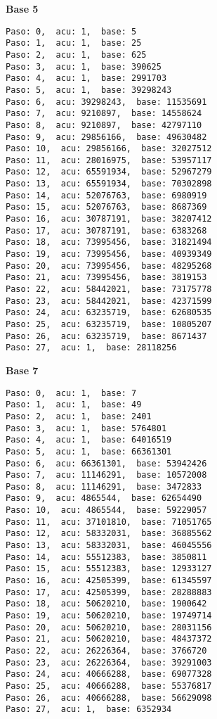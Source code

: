 \documentclass[a4paper]{article}
\begin{document}
\textbf{Base 5}
\begin{verbatim}
Paso: 0,  acu: 1,  base: 5  
Paso: 1,  acu: 1,  base: 25  
Paso: 2,  acu: 1,  base: 625  
Paso: 3,  acu: 1,  base: 390625  
Paso: 4,  acu: 1,  base: 2991703  
Paso: 5,  acu: 1,  base: 39298243  
Paso: 6,  acu: 39298243,  base: 11535691  
Paso: 7,  acu: 9210897,  base: 14558624  
Paso: 8,  acu: 9210897,  base: 42797110  
Paso: 9,  acu: 29856166,  base: 49630482  
Paso: 10,  acu: 29856166,  base: 32027512  
Paso: 11,  acu: 28016975,  base: 53957117  
Paso: 12,  acu: 65591934,  base: 52967279  
Paso: 13,  acu: 65591934,  base: 70302898  
Paso: 14,  acu: 52076763,  base: 6980919  
Paso: 15,  acu: 52076763,  base: 8687369  
Paso: 16,  acu: 30787191,  base: 38207412  
Paso: 17,  acu: 30787191,  base: 6383268  
Paso: 18,  acu: 73995456,  base: 31821494  
Paso: 19,  acu: 73995456,  base: 40939349  
Paso: 20,  acu: 73995456,  base: 48295268  
Paso: 21,  acu: 73995456,  base: 3819153  
Paso: 22,  acu: 58442021,  base: 73175778  
Paso: 23,  acu: 58442021,  base: 42371599  
Paso: 24,  acu: 63235719,  base: 62680535  
Paso: 25,  acu: 63235719,  base: 10805207  
Paso: 26,  acu: 63235719,  base: 8671437  
Paso: 27,  acu: 1,  base: 28118256
\end{verbatim}

\textbf{Base 7}
\begin{verbatim}
Paso: 0,  acu: 1,  base: 7  
Paso: 1,  acu: 1,  base: 49  
Paso: 2,  acu: 1,  base: 2401  
Paso: 3,  acu: 1,  base: 5764801  
Paso: 4,  acu: 1,  base: 64016519  
Paso: 5,  acu: 1,  base: 66361301  
Paso: 6,  acu: 66361301,  base: 53942426  
Paso: 7,  acu: 11146291,  base: 10572008  
Paso: 8,  acu: 11146291,  base: 3472833  
Paso: 9,  acu: 4865544,  base: 62654490  
Paso: 10,  acu: 4865544,  base: 59229057  
Paso: 11,  acu: 37101810,  base: 71051765  
Paso: 12,  acu: 58332031,  base: 36885562  
Paso: 13,  acu: 58332031,  base: 46045556  
Paso: 14,  acu: 55512383,  base: 3850811  
Paso: 15,  acu: 55512383,  base: 12933127  
Paso: 16,  acu: 42505399,  base: 61345597  
Paso: 17,  acu: 42505399,  base: 28288883  
Paso: 18,  acu: 50620210,  base: 1900642  
Paso: 19,  acu: 50620210,  base: 19749714  
Paso: 20,  acu: 50620210,  base: 28031156  
Paso: 21,  acu: 50620210,  base: 48437372  
Paso: 22,  acu: 26226364,  base: 3766720  
Paso: 23,  acu: 26226364,  base: 39291003  
Paso: 24,  acu: 40666288,  base: 69077328  
Paso: 25,  acu: 40666288,  base: 55376817  
Paso: 26,  acu: 40666288,  base: 56629098  
Paso: 27,  acu: 1,  base: 6352934  
\end{verbatim}
\end{document}
